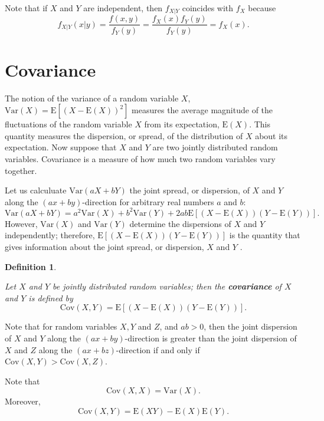\documentclass[
]{book}
\theoremstyle{definition}
\newtheorem{definition}{Definition}[chapter]
\theoremstyle{definition}
\theoremstyle{definition}
\theoremstyle{definition}
\theoremstyle{remark}
\begin{document}
Note that if \(X\) and \(Y\) are independent, then \(f_{X|Y}\) coincides with
\(f_X\) because
\[f_{X|Y}(x|y) = \frac{f(x,y)}{f_Y(y)} =\frac{f_X(x)f_Y(y)}{f_Y(y)} = f_X(x).\]

\hypertarget{covariance}{%
\section{Covariance}\label{covariance}}

The notion of the variance of a random variable \(X\),
\(\mathrm{Var}(X) = \mathrm{E}[ ( X - \mathrm{E}(X))^2]\) measures the
average magnitude of the fluctuations of the random variable \(X\) from
its expectation, \(\mathrm{E}(X)\). This quantity measures the dispersion,
or spread, of the distribution of \(X\) about its expectation. Now suppose
that \(X\) and \(Y\) are two jointly distributed random variables.
Covariance is a measure of how much two random variables vary together.

Let us calculuate \(\mathrm{Var}(aX + bY)\) the joint spread, or
dispersion, of \(X\) and \(Y\) along the \((ax + by)\)-direction for arbitrary
real numbers \(a\) and \(b\):
\[\mathrm{Var}(aX + bY) = a^2 \mathrm{Var}(X) + b^2 \mathrm{Var}(Y) + 2 a b \mathrm{E}[(X - \mathrm{E}(X))(Y - \mathrm{E}(Y))].\]
However, \(\mathrm{Var}(X)\) and \(\mathrm{Var}(Y )\) determine the
dispersions of \(X\) and \(Y\) independently; therefore,
\(\mathrm{E}[(X - \mathrm{E}(X))(Y - \mathrm{E}(Y))]\) is the quantity
that gives information about the joint spread, or dispersion, \(X\) and
\(Y\) .

\begin{definition}
\protect\hypertarget{def:unlabeled-div-26}{}\label{def:unlabeled-div-26}

\emph{Let \(X\) and \(Y\) be jointly distributed random
variables; then the \textbf{covariance} of \(X\) and \(Y\) is defined by
\[\mathrm{Cov}(X,Y) =  \mathrm{E}[(X - \mathrm{E}(X))(Y - \mathrm{E}(Y))].\]}

\end{definition}

Note that for random variables \(X, Y\) and \(Z\), and \(ab > 0\), then the
joint dispersion of \(X\) and \(Y\) along the \((ax + by)\)-direction is
greater than the joint dispersion of \(X\) and \(Z\) along the
\((ax + bz)\)-direction if and only if
\(\mathrm{Cov}(X, Y) > \mathrm{Cov}(X,Z).\)

Note that \[\mathrm{Cov}(X, X) = \mathrm{Var}(X).\] Moreover,
\[\mathrm{Cov}(X,Y) = \mathrm{E}(XY) - \mathrm{E}(X)\mathrm{E}(Y).\]
\end{document}
